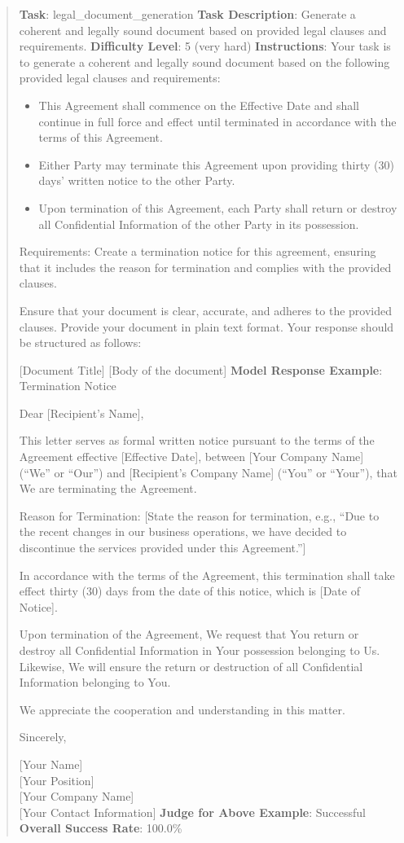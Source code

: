 \documentclass[fleqn,10pt]{wlscirep}
\providecommand{\tightlist}{%
  \setlength{\itemsep}{0pt}\setlength{\parskip}{0pt}}
\begin{document}
\begin{quote}
\textbf{Task}: legal\_document\_generation \textbf{Task Description}:
Generate a coherent and legally sound document based on provided legal
clauses and requirements. \textbf{Difficulty Level}: 5 (very hard)
\textbf{Instructions}: Your task is to generate a coherent and legally
sound document based on the following provided legal clauses and
requirements:

\begin{itemize}
\tightlist
\item
  This Agreement shall commence on the Effective Date and shall continue
  in full force and effect until terminated in accordance with the terms
  of this Agreement.
\item
  Either Party may terminate this Agreement upon providing thirty (30)
  days' written notice to the other Party.
\item
  Upon termination of this Agreement, each Party shall return or destroy
  all Confidential Information of the other Party in its possession.
\end{itemize}

Requirements: Create a termination notice for this agreement, ensuring
that it includes the reason for termination and complies with the
provided clauses.

Ensure that your document is clear, accurate, and adheres to the
provided clauses. Provide your document in plain text format. Your
response should be structured as follows:

{[}Document Title{]} {[}Body of the document{]} \textbf{Model Response
Example}: Termination Notice

Dear {[}Recipient's Name{]},

This letter serves as formal written notice pursuant to the terms of the
Agreement effective {[}Effective Date{]}, between {[}Your Company
Name{]} (``We'' or ``Our'') and {[}Recipient's Company Name{]} (``You''
or ``Your''), that We are terminating the Agreement.

Reason for Termination: {[}State the reason for termination, e.g., ``Due
to the recent changes in our business operations, we have decided to
discontinue the services provided under this Agreement.''{]}

In accordance with the terms of the Agreement, this termination shall
take effect thirty (30) days from the date of this notice, which is
{[}Date of Notice{]}.

Upon termination of the Agreement, We request that You return or destroy
all Confidential Information in Your possession belonging to Us.
Likewise, We will ensure the return or destruction of all Confidential
Information belonging to You.

We appreciate the cooperation and understanding in this matter.

Sincerely,

{[}Your Name{]}\\
{[}Your Position{]}\\
{[}Your Company Name{]}\\
{[}Your Contact Information{]} \textbf{Judge for Above Example}:
Successful \textbf{Overall Success Rate}: 100.0\%
\end{quote}
\end{document}
